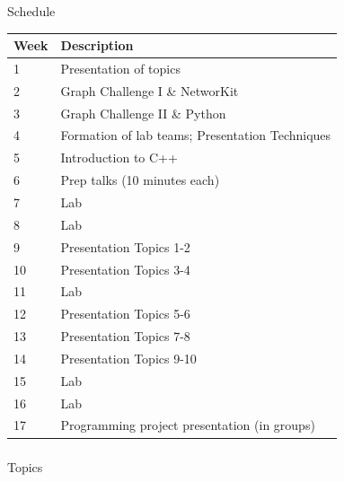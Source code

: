 \documentclass[titlepage,german,presentation]{beamer}
\begin{document}
\begin{frame}{Schedule}

\small{
    \centering
      \begin{tabular}{|l||l|} \hline
        Week & Description  \\ \hline
        1 &  Presentation of topics \\
        2 &  Graph Challenge I \& NetworKit \\
        3 &  Graph Challenge II \& Python \\
        4 &  Formation of lab teams; Presentation Techniques \\
        5 &  Introduction to C++ \\
        6 &  Prep talks (10 minutes each) \\
        7 &  Lab \\
        8 &  Lab \\
        9 &  Presentation Topics 1-2 \\
        10 & Presentation Topics 3-4 \\
        11 & Lab \\ 
        12 & Presentation Topics 5-6 \\
        13 & Presentation Topics 7-8 \\
        14 & Presentation Topics 9-10 \\ 
        15 & Lab \\
        16 & Lab \\
        17 & Programming project presentation (in groups) \\ \hline
      \end{tabular}
}
\end{frame}

\begin{frame}
  \frametitle{}
  \huge
  \centering
  Topics

\end{frame}



\end{document}
